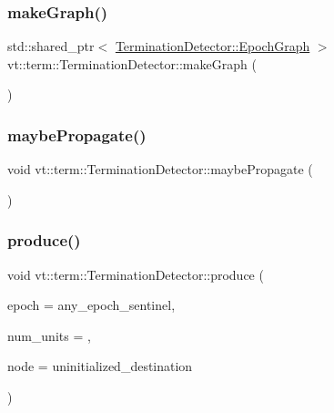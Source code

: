 \mbox{\label{structvt_1_1term_1_1_termination_detector_adb20ee8033c61f520d50592dd33b3080}} 
\subsubsection{\texorpdfstring{make\+Graph()}{makeGraph()}}
{\footnotesize\ttfamily std\+::shared\+\_\+ptr$<$ \hyperlink{structvt_1_1term_1_1_termination_detector_af67f0ab522e54eb06d8ac541526155e3}{Termination\+Detector\+::\+Epoch\+Graph} $>$ vt\+::term\+::\+Termination\+Detector\+::make\+Graph (\begin{DoxyParamCaption}{ }\end{DoxyParamCaption})}

\mbox{\label{structvt_1_1term_1_1_termination_detector_a4a54157fff0152b531b26c4a18393049}} 
\subsubsection{\texorpdfstring{maybe\+Propagate()}{maybePropagate()}}
{\footnotesize\ttfamily void vt\+::term\+::\+Termination\+Detector\+::maybe\+Propagate (\begin{DoxyParamCaption}{ }\end{DoxyParamCaption})}

\mbox{\label{structvt_1_1term_1_1_termination_detector_a3c31a1c36b5d55e9d28b5b26b2436573}} 
\subsubsection{\texorpdfstring{produce()}{produce()}}
{\footnotesize\ttfamily void vt\+::term\+::\+Termination\+Detector\+::produce (\begin{DoxyParamCaption}\item[{\hyperlink{namespacevt_a985a5adf291c34a3ca263b3378388236}{Epoch\+Type}}]{epoch = {\ttfamily any\+\_\+epoch\+\_\+sentinel},  }\item[{\hyperlink{namespacevt_1_1term_a4fd378cdb0c36683afc1b3399d685f7f}{Term\+Counter\+Type}}]{num\+\_\+units = {},  }\item[{\hyperlink{namespacevt_a866da9d0efc19c0a1ce79e9e492f47e2}{Node\+Type}}]{node = {\ttfamily uninitialized\+\_\+destination} }\end{DoxyParamCaption})\hspace{0.3cm}{\ttfamily [inline]}}

